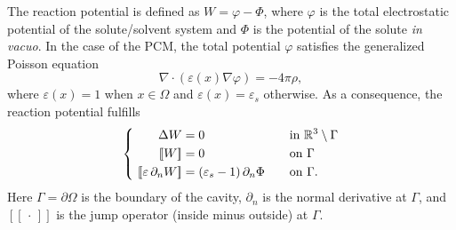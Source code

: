 The reaction potential is defined as $W = \varphi - \Phi$, where $\varphi$ is the total electrostatic potential of the solute/solvent system and $\Phi$ is the potential of the solute \emph{in vacuo}. In the case of the PCM, the total potential $\varphi$ satisfies the generalized Poisson equation\cite{Mennucci_JCP_IEF1,Mennucci_JMC_IEF2}
\begin{equation}
 \label{eq:genpoisson}
 \nabla \cdot (\varepsilon(x) \nabla \varphi) = -4\pi \rho,
\end{equation}
where $\varepsilon(x) = 1$ when $x \in \Omega$ and $\varepsilon(x) = \varepsilon_s$ otherwise. As a consequence, the reaction potential fulfills
\begin{equation} 
\label{eq:pcmpde}
\left \{ 
\begin{alignedat}{4}
\Delta  W &= 0  &&\mbox{in } \mathbb{R}^3\setminus \Gamma  \\
 \ [\![W]\!] &= 0  &&\mbox{on } \Gamma\\
\  [\![\varepsilon \, \partial_n W]\!] &= (\varepsilon_s-1)\, \partial_n \Phi &\qquad& \mbox{on } \Gamma.
\end{alignedat} 
\right.
\end{equation}
Here $\Gamma=\partial\Omega$ is the boundary of the cavity, $\partial_n$ is the normal derivative at $\Gamma$, and $[\![\,\cdot\,]\!]$ is the jump operator (inside minus outside) at $\Gamma$.


